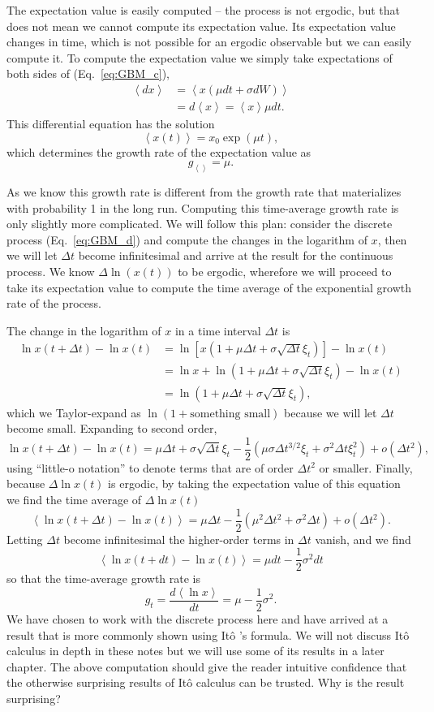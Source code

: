 \documentclass[a4paper]{article}
\newcommand{\Ito}{It\^{o} }
\newcommand{\ave}[1]{\left\langle#1 \right\rangle}
\newcommand{\gt}{g_{t}}
\newcommand{\eref}[1]{(Eq.~\ref{eq:#1})}
\newcommand{\be}{\begin{equation}}
\newcommand{\ee}{\end{equation}}
\newcommand{\bea}{\begin{eqnarray}}
\newcommand{\eea}{\end{eqnarray}}
\begin{document}
The expectation value is easily computed -- the process is not ergodic, but that does not mean we cannot
compute its expectation value. Its expectation value changes in time, which is not possible for an ergodic 
observable but we can easily compute it. To compute the expectation value we simply take expectations of both sides of
\eref{GBM_c},
\bea
\ave{dx}&=\ave{x(\mu dt+ \sigma dW)}\\
&=d\ave{x}=\ave{x} \mu dt.
\eea
This differential equation has the solution 
\be
\ave{x(t)}=x_0\exp(\mu t),
\ee
which determines the growth rate of the expectation value as 
\be
g_{\ave{}}=\mu.
\ee

As we know this growth rate is different from the growth rate that materializes with probability 1 in the long run. 
Computing this time-average growth rate is only slightly more complicated. 
We will follow this plan: consider the discrete process \eref{GBM_d} and compute the changes in the logarithm of $x$, 
then we will let
$\Delta t$ become infinitesimal and arrive at the result for the continuous process. We know $\Delta \ln(x(t))$
to be ergodic, wherefore we will proceed to take its expectation value to compute the time average 
of the exponential growth rate of the process. 

The change in the logarithm of $x$ in a time interval $\Delta t$ is
\bea
\ln x(t+\Delta t) - \ln x(t) &=\ln [x(1+\mu \Delta t+ \sigma \sqrt{\Delta t} \xi_t)] - \ln x(t)\\
&=\ln x + \ln (1+\mu \Delta t+ \sigma \sqrt{\Delta t} \xi_t) - \ln x(t)\\
&=\ln (1+\mu \Delta t+ \sigma \sqrt{\Delta t} \xi_t),
\eea
which we Taylor-expand as $\ln(1+ \text{something small})$ because we will let $\Delta t$ become small.
Expanding to second order,
\be
\ln x(t+\Delta t) - \ln x(t) =\mu \Delta t+ \sigma \sqrt{\Delta t} \xi_t - \frac{1}{2} \left(\mu \sigma \Delta t^{3/2}\xi_t+
\sigma^2\Delta t 
\xi_t^2\right)+o(\Delta t^2),
\ee
using ``little-o notation'' to denote terms that are of order $\Delta t^2$ or smaller. Finally, because
$\Delta \ln x(t)$ is ergodic, by taking the expectation value of this equation we find the
time average of $\Delta \ln x(t)$
\be
\ave{\ln x(t+\Delta t) - \ln x(t)} =\mu \Delta t- \frac{1}{2} \left(\mu^2\Delta t^2+\sigma^2\Delta t \right)+o(\Delta t^2).
\ee
Letting $\Delta t$ become infinitesimal the higher-order terms in $\Delta t$ vanish, and we find
\be
\ave{\ln x(t+dt) - \ln x(t)} =\mu dt- \frac{1}{2} \sigma^2 dt
\ee
so that the time-average growth rate is
\be
\gt=\frac{d \ave{\ln x}}{dt}=\mu - \frac{1}{2} \sigma^2.
\ee
We have chosen to work with the discrete process here and have arrived at a result that is more
commonly shown using \Ito's formula. We will not discuss \Ito calculus in depth in these notes 
but we will use some of its results in a later chapter. The above computation should give the reader
intuitive confidence that the otherwise surprising results of \Ito calculus can be trusted. Why is the result surprising?
\end{document}
